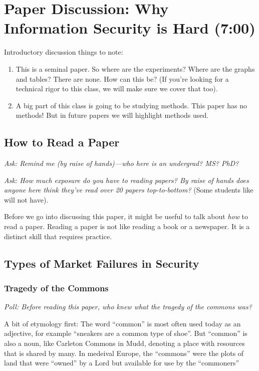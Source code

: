 \documentclass[11pt]{article}
\begin{document}
\section{Paper Discussion: Why Information Security is Hard (7:00)}


Introductory discussion things to note:
\begin{enumerate}
    \item This is a seminal paper. So where are the experiments? Where are the graphs and tables? There are none. How can this be? (If you're looking for a technical rigor to this class, we will make sure we cover that too).
    \item A big part of this class is going to be studying methods. This paper has no methods! But in future papers we will highlight methods used. 
\end{enumerate}

\subsection{How to Read a Paper}

{\it Ask: Remind me (by raise of hands)---who here is an undergrad? MS? PhD?}

{\it Ask: How much exposure do you have to reading papers? By raise of hands does anyone here think they've read over 20 papers top-to-bottom?} (Some students like will not have).

Before we go into discussing this paper, it might be useful to talk about {\it how} to read a paper. Reading a paper is not like reading a book or a newspaper. It is a distinct skill that requires practice.



\subsection{Types of Market Failures in Security}

\subsubsection{Tragedy of the Commons}

{\it Poll: Before reading this paper, who knew what the tragedy of the commons was?}

A bit of etymology first: The word ``common'' is most often used today as an adjective, for example ``sneakers are a common type of shoe''.
But ``common'' is also a noun, like Carleton Commons in Mudd, denoting a place with resources that is shared by many. In medeival Europe, the ``commons'' were the plots of land that were ``owned'' by a Lord but available for use by the ``commoners''
\end{document}
